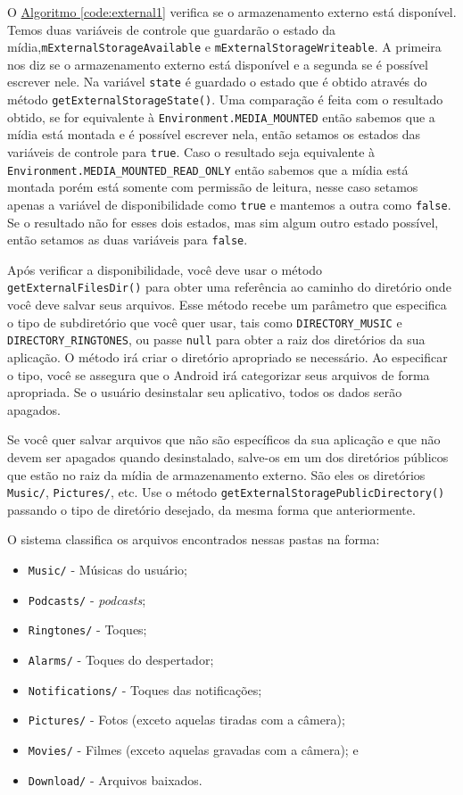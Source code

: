 \documentclass[a4paper,12pt,brazil,oneside]{book}
\begin{document}
		O \hyperref[code:external1]{Algoritmo \ref*{code:external1}} verifica se o armazenamento externo está disponível. Temos duas variáveis de controle que guardarão o estado da mídia,\texttt{mExternalStorageAvailable} e \texttt{mExternalStorageWriteable}. A primeira nos diz se o armazenamento externo está disponível e a segunda se é possível escrever nele. Na variável \texttt{state} é guardado o estado que é obtido através do método \texttt{getExternalStorageState()}. Uma comparação é feita com o resultado obtido, se for equivalente à \texttt{Environment.MEDIA\_MOUNTED} então sabemos que a mídia está montada e é possível escrever nela, então setamos os estados das variáveis de controle para \texttt{true}. Caso o resultado seja equivalente à \texttt{Environment.MEDIA\_MOUNTED\_READ\_ONLY} então sabemos que a mídia está montada porém está somente com permissão de leitura, nesse caso setamos apenas a variável de disponibilidade como \texttt{true} e mantemos a outra como \texttt{false}. Se o resultado não for esses dois estados, mas sim algum outro estado possível, então setamos as duas variáveis para \texttt{false}.

		Após verificar a disponibilidade, você deve usar o método \texttt{getExternalFilesDir()} para obter uma referência ao caminho do diretório onde você deve salvar seus arquivos. Esse método recebe um parâmetro que especifica o tipo de subdiretório que você quer usar, tais como \texttt{DIRECTORY\_MUSIC} e \texttt{DIRECTORY\_RINGTONES}, ou passe \texttt{null} para obter a raiz dos diretórios da sua aplicação. O método irá criar o diretório apropriado se necessário. Ao especificar o tipo, você se assegura que o Android irá categorizar seus arquivos de forma apropriada. Se o usuário desinstalar seu aplicativo, todos os dados serão apagados.

		Se você quer salvar arquivos que não são específicos da sua aplicação e que não devem ser apagados quando desinstalado, salve-os em um dos diretórios públicos que estão no raiz da mídia de armazenamento externo. São eles os diretórios \texttt{Music/}, \texttt{Pictures/}, etc. Use o método \texttt{getExternalStoragePublicDirectory()} passando o tipo de diretório desejado, da mesma forma que anteriormente.

		O sistema classifica os arquivos encontrados nessas pastas na forma:

		\begin{itemize}
			\item \texttt{Music/} - Músicas do usuário;
			\item \texttt{Podcasts/} - \emph{podcasts};
			\item \texttt{Ringtones/} - Toques;
			\item \texttt{Alarms/} - Toques do despertador;
			\item \texttt{Notifications/} - Toques das notificações;
			\item \texttt{Pictures/} - Fotos (exceto aquelas tiradas com a câmera);
			\item \texttt{Movies/} - Filmes (exceto aquelas gravadas com a câmera); e
			\item \texttt{Download/} - Arquivos baixados.
		\end{itemize}
\end{document}
